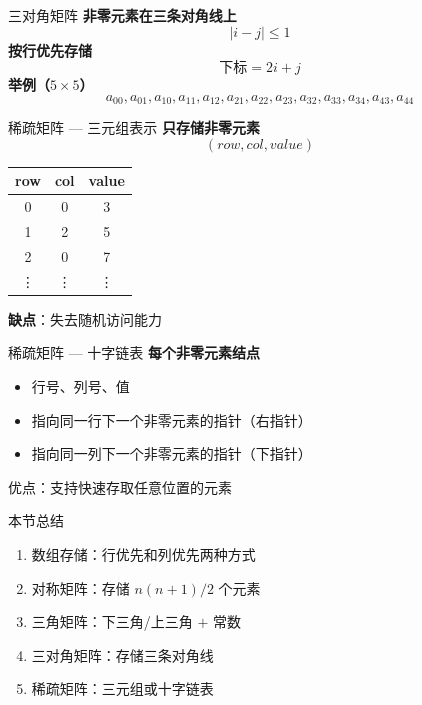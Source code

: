 \documentclass[10pt, aspectratio=169]{beamer}
\begin{document}
\begin{frame}{三对角矩阵}
    \textbf{非零元素在三条对角线上}
    \[
    |i - j| \le 1
    \]
    \vspace{0.3em}
    \textbf{按行优先存储}
    \[
    \text{下标} = 2i + j
    \]
    \vspace{0.3em}
    \textbf{举例（$5 \times 5$）}
    \[
    a_{00}, a_{01}, a_{10}, a_{11}, a_{12}, a_{21}, a_{22}, a_{23}, a_{32}, a_{33}, a_{34}, a_{43}, a_{44}
    \]
\end{frame}

\begin{frame}{稀疏矩阵 --- 三元组表示}
    \textbf{只存储非零元素}
    \[
    (row, col, value)
    \]
    \vspace{0.3em}
    \begin{center}
    \begin{tabular}{|c|c|c|}
        \hline
        row & col & value \\
        \hline
        0 & 0 & 3 \\
        \hline
        1 & 2 & 5 \\
        \hline
        2 & 0 & 7 \\
        \hline
        \vdots & \vdots & \vdots \\
        \hline
    \end{tabular}
    \end{center}
    \vspace{0.3em}
    \textbf{缺点}：失去随机访问能力
\end{frame}

\begin{frame}{稀疏矩阵 --- 十字链表}
    \textbf{每个非零元素结点}
    \begin{itemize}
        \item 行号、列号、值
        \item 指向同一行下一个非零元素的指针（右指针）
        \item 指向同一列下一个非零元素的指针（下指针）
    \end{itemize}
    \vspace{0.5em}
    优点：支持快速存取任意位置的元素
\end{frame}

\begin{frame}{本节总结}
    \begin{enumerate}
        \item 数组存储：行优先和列优先两种方式
        \item 对称矩阵：存储 $n(n+1)/2$ 个元素
        \item 三角矩阵：下三角/上三角 $+$ 常数
        \item 三对角矩阵：存储三条对角线
        \item 稀疏矩阵：三元组或十字链表
    \end{enumerate}
\end{frame}
\end{document}
